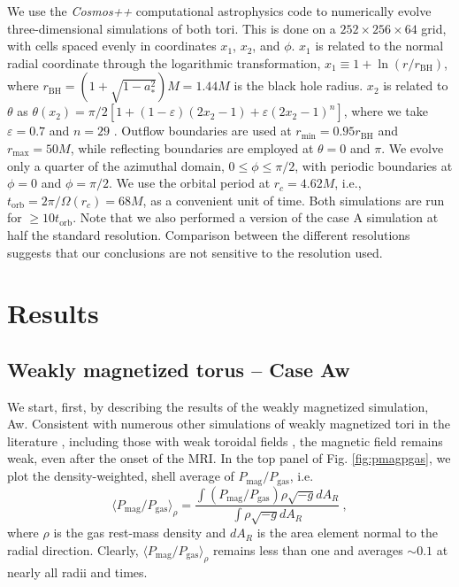 \documentclass[useAMS,usenatbib]{mn2e}
\begin{document}
We use the {\em Cosmos++} computational astrophysics code \citep{Anninos05,Fragile12} to numerically evolve three-dimensional simulations of both tori.  This is done on a $252 \times 256 \times 64$ grid, with cells spaced evenly in coordinates $x_1$, $x_2$, and $\phi$.  $x_1$ is related to the normal radial coordinate through the logarithmic transformation, $x_1 \equiv 1 + \ln(r/r_\mathrm{BH})$, where $r_\mathrm{BH} = (1 + \sqrt{1-a_*^2}) M = 1.44 M$ is the black hole radius.  $x_2$ is related to $\theta$ as $\theta(x_2)=\pi/2 [1+(1-\varepsilon)(2x_2-1)+\varepsilon(2x_2-1)^n]$, where we take $\varepsilon = 0.7$ and $n = 29$ \citep{Noble10}.  Outflow boundaries are used at $r_\mathrm{min} = 0.95 r_\mathrm{BH}$ and $r_\mathrm{max} = 50 M$, while reflecting boundaries are employed at $\theta = 0$ and $\pi$.  We evolve only a quarter of the azimuthal domain, $0 \le \phi \le \pi/2$, with periodic boundaries at $\phi = 0$ and $\phi = \pi/2$.  We use the orbital period at $r_{c} = 4.62 M$, i.e., $t_\mathrm{orb} = 2\pi/\Omega(r_{c}) = 68 M$, as a convenient unit of time.  Both simulations are run for $\ge 10 t_\mathrm{orb}$. Note that we also performed a version of the case A simulation at half the standard resolution.  Comparison between the different resolutions suggests that our conclusions are not sensitive to the resolution used.


\section{Results}
\label{s.results}

\subsection{Weakly magnetized torus -- Case Aw}

We start, first, by describing the results of the weakly magnetized simulation, Aw.  Consistent with numerous other simulations of weakly magnetized tori in the literature \citep[e.g.][]{Hawley00,DeVilliers03,Fragile07}, including those with weak toroidal fields \citep[e.g.][]{Beckwith08}, the magnetic field remains weak, even after the onset of the MRI.  In the top panel of Fig. \ref{fig:pmagpgas}, we plot the density-weighted, shell average of $P_\mathrm{mag}/P_\mathrm{gas}$, i.e.
\begin{equation}
\langle P_\mathrm{mag}/P_\mathrm{gas} \rangle_\rho = \frac{\int (P_\mathrm{mag}/P_\mathrm{gas}) \rho \sqrt{-g} dA_R}{\int \rho \sqrt{-g} dA_R} ~,
\label{eq:magnetization}
\end{equation}
where $\rho$ is the gas rest-mass density and $dA_R$ is the area element normal to the radial direction.  Clearly, $\langle P_\mathrm{mag}/P_\mathrm{gas} \rangle_\rho$ remains less than one and averages $\sim 0.1$ at nearly all radii and times.  
\end{document}
